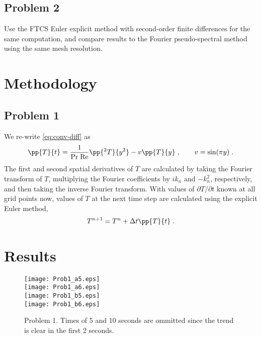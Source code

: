 \documentclass[11pt]{article}
\begin{document}
\subsection{Problem 2}

Use the FTCS Euler explicit method with second-order finite differences for the same computation, and compare results to the Fourier pseudo-spectral method using the same mesh resolution.

\section{Methodology} %

\subsection{Problem 1}

We re-write \eqref{eq:conv-diff} as
\begin{equation}
\pp{T}{t} = \frac{1}{\text{Pr}\;\text{Re}} \pp{^2T}{y^2} - v \pp{T}{y} 
\;, \qquad
v = \sin(\pi y)
\;.
\end{equation}
The first and second spatial derivatives of $T$ are calculated by taking the Fourier transform of $T$, multiplying the Fourier coefficients by $i k_n$ and $-k_n^2$, respectively, and then taking the inverse Fourier transform. With values of $\partial T / \partial t$ known at all grid points now, values of $T$ at the next time step are calculated using the explicit Euler method,
\begin{equation}
T^{n+1} = T^n + \Delta t \pp{T}{t}
\;.
\end{equation}

\section{Results} %

\begin{figure}[p!]
\begin{center}
\texttt{[image: Prob1\_a5.eps]} \\
\texttt{[image: Prob1\_a6.eps]} \\
\texttt{[image: Prob1\_b5.eps]} \\
\texttt{[image: Prob1\_b6.eps]}
\\[0.5cm]
\caption{Problem 1. Times of 5 and 10 seconds are ommitted since the trend is clear in the first 2 seconds.}
\label{fig:MacCormack}
\end{center}
\end{figure}
\end{document}
